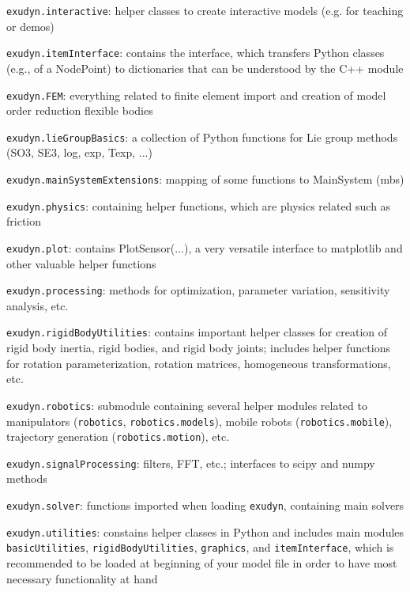     \item[--] \texttt{exudyn.interactive}: helper classes to create interactive models (e.g. for teaching or demos)
    \item[--] \texttt{exudyn.itemInterface}: contains the interface, which transfers Python classes (e.g., of a NodePoint) to dictionaries that can be understood by the C++ module
    \item[--] \texttt{exudyn.FEM}: everything related to finite element import and creation of model order reduction flexible bodies
    \item[--] \texttt{exudyn.lieGroupBasics}: a collection of Python functions for Lie group methods (SO3, SE3, log, exp, Texp, ...)
    \item[--] \texttt{exudyn.mainSystemExtensions}: mapping of some functions to MainSystem (mbs)
    \item[--] \texttt{exudyn.physics}: containing helper functions, which are physics related such as friction
    \item[--] \texttt{exudyn.plot}: contains PlotSensor(...), a very versatile interface to matplotlib and other valuable helper functions
    \item[--] \texttt{exudyn.processing}: methods for optimization, parameter variation, sensitivity analysis, etc.
    \item[--] \texttt{exudyn.rigidBodyUtilities}: contains important helper classes for creation of rigid body inertia, rigid bodies, and rigid body joints; includes helper functions for rotation parameterization, rotation matrices, homogeneous transformations, etc.
    \item[--] \texttt{exudyn.robotics}: submodule containing several helper modules related to manipulators (\texttt{robotics}, \texttt{robotics.models}), mobile robots (\texttt{robotics.mobile}), trajectory generation (\texttt{robotics.motion}), etc.
    \item[--] \texttt{exudyn.signalProcessing}: filters, FFT, etc.; interfaces to scipy and numpy methods
    \item[--] \texttt{exudyn.solver}: functions imported when loading \texttt{exudyn}, containing main solvers
    \item[--] \texttt{exudyn.utilities}: constains helper classes in Python and includes \codeName main modules \texttt{basicUtilities}, \texttt{rigidBodyUtilities}, \texttt{graphics}, and \texttt{itemInterface}, which is recommended to be loaded at beginning of your model file in order to have most necessary functionality at hand
